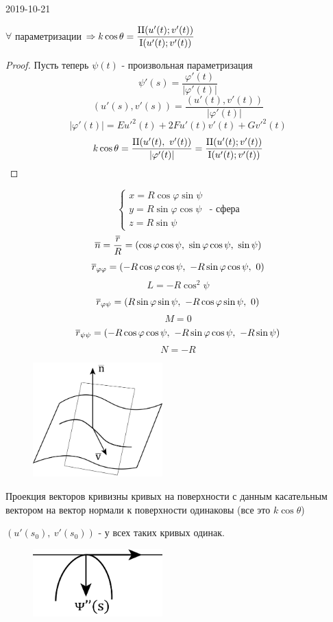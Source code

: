 \documentclass[main, 12pt, fleqn]{subfiles}
\begin{document}
\begin{lect} {2019-10-21}
	\begin{theorem}
		$\forall$ параметризации $\Ra k \cos \theta = \dfrac{\RNumb{2} (u'(t); v'(t))}{\RNumb{1} (u'(t); v'(t))}$
	\end{theorem}
	\begin{proof}
		Пусть теперь $\psi(t)$ - произвольная параметризация
		\[\psi'(s) = \dfrac{\varphi'(t)}{|\varphi'(t)|}\]
		\[(u'(s), v'(s)) = \dfrac{(u'(t), v'(t))}{|\varphi'(t)|}\]
		\[|\varphi'(t)| = E u'^2(t) + 2F u'(t) v'(t) + G v'^2(t)\]
		\[k \cos \theta = \dfrac{\RNumb{2} (u'(t),\ v'(t))}{|\varphi'(t)|} = \dfrac{\RNumb{2} (u'(t); v'(t))}{\RNumb{1} (u'(t); v'(t))}\]
	\end{proof}

	\begin{Example}
		\[\begin{cases}
			x = R \cos \varphi \sin \psi\\
			y = R \sin \varphi \cos \psi\\
			z = R \sin \psi
		\end{cases} \text{ - сфера}\]
		\[\overline{n} = \dfrac{\overline{r}}{R} = (\cos \varphi \cos \psi,\ \sin \varphi \cos \psi,\ \sin \psi)\]
		\[\overline{r}_{\varphi \varphi} = (-R \cos \varphi \cos \psi,\ -R \sin \varphi \cos \psi,\ 0)\]
		\[L = -R \cos^2 \psi\]
		\[\overline{r}_{\varphi \psi} = (R \sin \varphi \sin \psi,\ -R \cos \varphi \sin \psi,\ 0)\]
		\[M = 0\]
		\[\overline{r}_{\psi \psi} = (-R \cos \varphi \cos \psi,\ -R \sin \varphi \cos \psi,\ -R \sin \psi)\]
		\[N = -R\]
	\end{Example}

	\begin{figure}[H]
		\centering
		\includegraphics[width=5cm]{pics/7_7.png}
	\end{figure}
	\begin{theorem}
		Проекция векторов кривизны кривых на поверхности с данным касательным вектором на вектор нормали к поверхности одинаковы (все это $k \cos \theta$)
	\end{theorem}
	$(u'(s_0),\ v'(s_0)) \text{ - у всех таких кривых одинак.}$
	\begin{figure}[H]
		\centering
		\includegraphics[width=5cm]{pics/7_8.png}
	\end{figure}


\end{lect}
\end{document}

